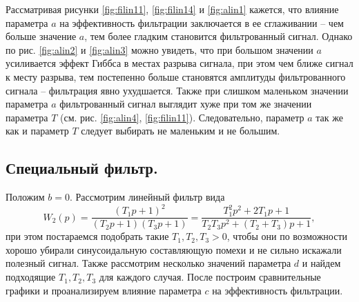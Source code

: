 \documentclass[a4paper, 12pt]{article}
\begin{document}
    
    Рассматривая рисунки \ref{fig:filin11}, \ref{fig:filin14} и \ref{fig:alin1} кажется, что
    влияние параметра $a$ на эффективность фильтрации заключается в ее сглаживании -- чем больше значение $a$, тем более гладким становится фильтрованный сигнал.
    Однако по рис. \ref{fig:alin2} и \ref{fig:alin3} можно увидеть, что при большом значении $a$ усиливается эффект Гиббса в местах разрыва сигнала, при этом
    чем ближе сигнал к месту разрыва, тем постепенно больше становятся амплитуды фильтрованного сигнала -- фильтрация явно ухудшается. Также при слишком маленьком
    значении параметра $a$ фильтрованный сигнал выглядит хуже при том же значении параметра $T$ (см. рис. \ref{fig:alin4}, \ref{fig:filin11}). Следовательно, параметр
    $a$ так же как и параметр $T$ следует выбирать не маленьким и не большим.


    \subsection{Специальный фильтр.}
    Положим $b=0$. Рассмотрим линейный фильтр вида
    $$W_2(p)=\dfrac{\left(T_1p+1\right)^{2}}{\left(T_2p+1\right)\left(T_3p+1\right)}=\dfrac{T_1^2p^2+2T_1p+1}{T_2T_3p^2+\left(T_2+T_3\right)p+1},$$
    при этом постараемся подобрать такие $T_1,T_2,T_3>0$, чтобы они по возможности хорошо убирали синусоидальную составляющую помехи и не сильно искажали
    полезный сигнал. Также рассмотрим несколько значений параметра $d$ и найдем подходящие $T_1,T_2,T_3$ для каждого случая. После построим сравнительные
    графики и проанализируем влияние параметра $c$ на эффективность фильтрации.
\end{document}

